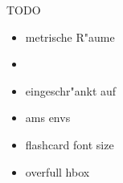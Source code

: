 \documentclass[class=article, crop=false]{standalone}
\begin{document}
\begin{zettel}{TODO}
    \begin{itemize}
        \item metrische R"aume
        \item \R
        \item eingeschr"ankt auf
        \item ams envs
        \item flashcard font size
        \item overfull hbox
    \end{itemize}
\end{zettel}
\end{document}
